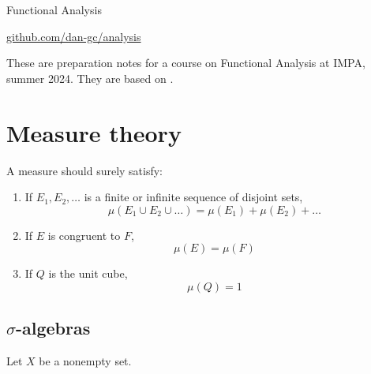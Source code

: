 \documentclass{article}
\theoremstyle{definition}
\numberwithin{equation}{section}
\begin{document}
	\begin{center}
		{\LARGE Functional Analysis}

		\href{https://github.com/dan-gc/analysis}{github.com/dan-gc/analysis}
	\end{center}
	These are preparation notes for a course on Functional Analysis at IMPA, summer 2024. They are based on \cite{folland,narici,brezis}.
	\tableofcontents
	\clearpage
	\section{Measure theory}
	{\small \color{blue}A measure should surely satisfy:
	\begin{enumerate}
		\item If $E_1,E_2,\ldots$ is a finite or infinite sequence of disjoint sets,
		\[\mu(E_1\cup E_2\cup\ldots)=\mu(E_1)+\mu(E_2)+\ldots\]
		
		\item If $E$ is congruent to $F$,
		\[\mu(E)=\mu(F)\]
		
		\item If $Q$ is the unit cube,
		\[\mu(Q)=1\]
	\end{enumerate}}
	\subsection{$\sigma$-algebras}
Let $X$ be a nonempty set. 
	
\end{document}
